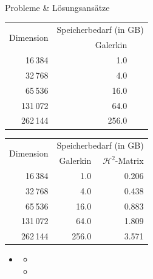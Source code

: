 \documentclass[10pt]{beamer}
\begin{document}
\begin{frame}{Probleme \& Lösungsansätze}
  \begin{overprint}
      \begin{table}[h]
        \begin{tabular}{rrr} \toprule
          \multirow{2}{*}{Dimension} & \multicolumn{2}{c}{Speicherbedarf (in 
          GB)} \\ \cmidrule{2-3}
                      & Galerkin & \\ \midrule
              16\,384 &      1.0 & \\
              32\,768 &      4.0 & \\
              65\,536 &     16.0 & \\
             131\,072 &     64.0 & \\
             262\,144 &    256.0 & \\ \bottomrule
        \end{tabular}
      \end{table}
      \begin{table}[h]
        \begin{tabular}{rrr} \toprule
          \multirow{2}{*}{Dimension} & \multicolumn{2}{c}{Speicherbedarf (in 
          GB)} \\ \cmidrule{2-3}
                      & Galerkin & \(\mathcal{H}^2\)-Matrix \\ \midrule
              16\,384 &      1.0 & 0.206 \\
              32\,768 &      4.0 & 0.438 \\
              65\,536 &     16.0 & 0.883 \\
             131\,072 &     64.0 & 1.809 \\
             262\,144 &    256.0 & 3.571 \\ \bottomrule
        \end{tabular}
      \end{table}
  \end{overprint}

  \begin{itemize}
    \item {}
    \begin{itemize}
      \item {}
      \item {}
    \end{itemize}
  \end{itemize}
\end{frame}
\end{document}
